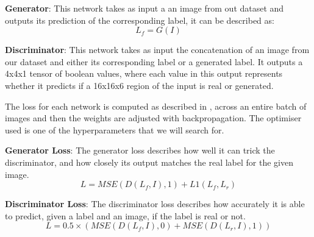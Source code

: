 \documentclass{UoYCSproject}
\begin{document}



\textbf{Generator}: This network takes as input a an image from out dataset and outputs its prediction of the corresponding label, it can be described as: \[ L_{f} = G(I) \]

\textbf{Discriminator}: This network takes as input the concatenation of an image from our dataset and either its corresponding label or a generated label. It outputs a 4x4x1 tensor of boolean values, where each value in this output represents whether it predicts if a 16x16x6 region of the input is real or generated.

The loss for each network is computed as described in \cite{isola2018imagetoimage}, across an entire batch of images and then the weights are adjusted with backpropagation. The optimiser used is one of the hyperparameters that we will search for.

\textbf{Generator Loss}: The generator loss describes how well it can trick the discriminator, and how closely its output matches the real label for the given image.
\[ L = MSE( D(L_{f}, I), 1 ) + L1(L_{f}, L_{r}) \]

\textbf{Discriminator Loss}: The discriminator loss describes how accurately it is able to predict, given a label and an image, if the label is real or not.
\[ L = 0.5 \times  ( MSE( D( L_{f}, I ), 0) + MSE( D( L_{r}, I ), 1) ) \]
\end{document}
